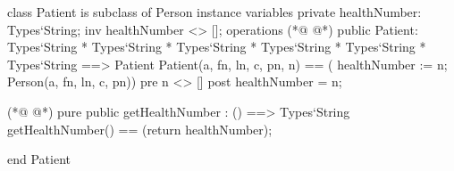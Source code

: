 \begin{vdmpp}[breaklines=true]
class Patient is subclass of Person
instance variables
  private healthNumber: Types`String;
  inv healthNumber <> [];
operations
(*@
\label{Patient:6}
@*)
 public Patient: Types`String * Types`String * Types`String * Types`String * Types`String * Types`String ==> Patient
  Patient(a, fn, ln, c, pn, n) == ( healthNumber := n; Person(a, fn, ln, c, pn))
 pre n <> []
 post healthNumber = n;
 
(*@
\label{getHealthNumber:11}
@*)
 pure public getHealthNumber : () ==> Types`String
  getHealthNumber() == (return healthNumber);

end Patient
\end{vdmpp}
